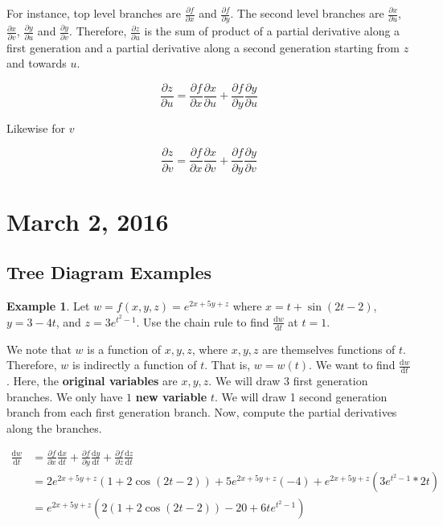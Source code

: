 \documentclass[11pt]{article}
\theoremstyle{plain} %
\theoremstyle{definition}
\theoremstyle{example}
\newtheorem*{example}{Example}
\theoremstyle{remark}
\begin{document}
For instance, top level branches are $\frac{\partial f}{\partial x}$ and $\frac{\partial f}{\partial y}$. The second level branches are $\frac{\partial x}{\partial u}$, $\frac{\partial x}{\partial v}$, $\frac{\partial y}{\partial u}$ and $\frac{\partial y}{\partial v}$. Therefore, $\frac{\partial z}{\partial u}$ is the sum of product of a partial derivative along a first generation and a partial derivative along a second generation starting from $z$ and towards $u$. 

$$\frac{\partial z}{\partial u} = \frac{\partial f}{\partial x}\frac{\partial x}{\partial u}+\frac{\partial f}{\partial y}\frac{\partial y}{\partial u}$$

Likewise for $v$

$$\frac{\partial z}{\partial v} = \frac{\partial f}{\partial x}\frac{\partial x}{\partial v}+\frac{\partial f}{\partial y}\frac{\partial y}{\partial v}$$



\section{March 2, 2016}
\subsection{Tree Diagram Examples}

\begin{example}
Let $w=f(x,y,z) = e^{2x+5y+z}$ where $x=t+\sin(2t-2)$, $y=3-4t$, and $z=3e^{t^2-1}$. Use the chain rule to find $\frac{\mathrm d w}{\mathrm d t}$ at $t=1$.
\end{example}

We note that $w$ is a function of $x, y, z$, where $x, y, z$ are themselves functions of $t$. Therefore, $w$ is indirectly a function of $t$. That is, $w=w(t)$. We want to find $\frac{\mathrm d w}{\mathrm d t}$.
Here, the \textbf{original variables} are $x, y, z$. We will draw 3 first generation branches.
We only have $1$ \textbf{new variable} $t$. We will draw 1 second generation branch from each first generation branch. Now, compute the partial derivatives along the branches.

\begin{align*}
	\frac{\mathrm d w}{\mathrm d t} &= \frac{\partial f}{\partial x}\frac{\mathrm d x}{\mathrm d t} + \frac{\partial f}{\partial y}\frac{\mathrm d y}{\mathrm d t}+\frac{\partial f}{\partial z}\frac{\mathrm d z}{\mathrm d t} \\
	&= 2e^{2x+5y+z}\left(1+2\cos(2t-2)\right)+5e^{2x+5y+z}\left(-4\right)+e^{2x+5y+z}\left(3e^{t^2-1}*2t\right)\\
	&= e^{2x+5y+z}\left(2(1+2\cos(2t-2))-20+6te^{t^2-1}\right)
\end{align*}
\end{document}

